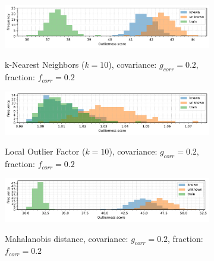 \begin{figure}[t]
    \centering
    \begin{subfigure}[b]{\textwidth}
        \centering
        \caption{\small k-Nearest Neighbors ($k=10$), covariance: $g_{corr} = 0.2$, fraction: $f_{corr} = 0.2$}
        \includegraphics[width=\textwidth]{images/correlations/hists/hist-correlations-n_correlated_0.20-covariance_0.20-distance_8-outliers_correlated_False-model_kNN-10-seed_0.pdf}
        \label{fig:hists-correlations-knn}
    \end{subfigure}
    \begin{subfigure}[b]{\textwidth}
        \centering
        \caption{\small Local Outlier Factor ($k=10$), covariance: $g_{corr} = 0.2$, fraction: $f_{corr} = 0.2$}
        \includegraphics[width=\textwidth]{images/correlations/hists/hist-correlations-n_correlated_0.20-covariance_0.20-distance_8-outliers_correlated_False-model_LOF-10-seed_0.pdf}
        \label{fig:hists-correlations-lof}
    \end{subfigure}
    \begin{subfigure}[b]{\textwidth}
        \centering
        \caption{\small Mahalanobis distance, covariance: $g_{corr} = 0.2$, fraction: $f_{corr} = 0.2$}
        \includegraphics[width=\textwidth]{images/correlations/hists/hist-correlations-n_correlated_0.20-covariance_0.20-distance_8-outliers_correlated_False-model_MD-seed_0.pdf}
        \label{fig:hists-correlations-md}
    \end{subfigure}
    \begin{subfigure}[b]{\textwidth}

\end{subfigure}
\end{figure}
